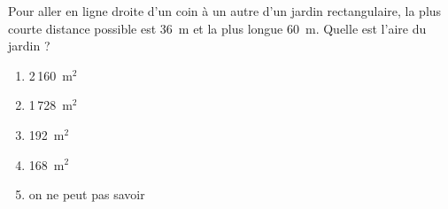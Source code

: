 Pour aller en ligne droite d'un coin à un autre d'un jardin rectangulaire, la plus courte distance possible est 36~m et la plus longue 60~m. Quelle est l'aire du  jardin ?
\begin{multicols}{3}
  \begin{enumerate}[A/]
  \item 2\,160~m$^2$
  \item 1\,728~m$^2$
  \item 192~m$^2$
  \item 168~m$^2$
  \item on ne peut pas savoir
  \end{enumerate}
\end{multicols}